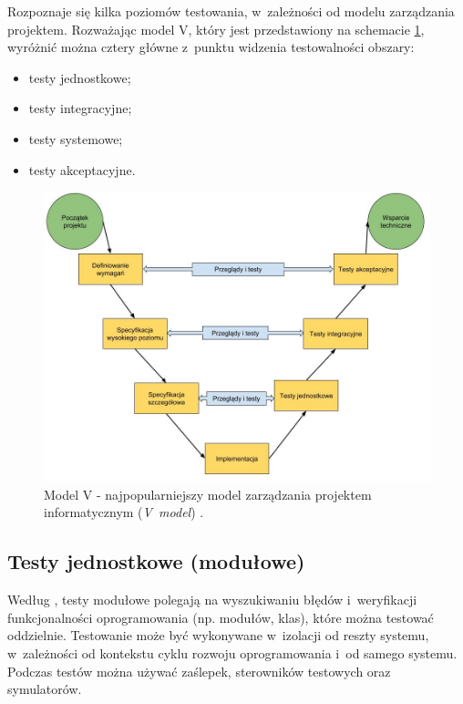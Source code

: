 Rozpoznaje się kilka poziomów testowania, w~zależności od modelu zarządzania projektem. Rozważając model V, który jest przedstawiony na schemacie \ref{fig:model_v}, wyróżnić można cztery główne  z~punktu widzenia testowalności obszary:

\begin{itemize}
\item
testy jednostkowe;
\item
testy integracyjne;
\item
testy systemowe;
\item
testy akceptacyjne.

\end{itemize}

\begin{figure}[!htb]
    \centering
    \includegraphics[width=12cm]{imgs/ch2_model_v_pl.jpg}
    \caption{Model V - najpopularniejszy model zarządzania projektem informatycznym (\textit{V~model}) \cite{website:android:modelv}.}
    \label{fig:model_v}
\end{figure} 

\subsection{Testy jednostkowe (modułowe)}

Według \cite{bib:sylabus:foundation}, testy modułowe polegają na wyszukiwaniu błędów i~weryfikacji funkcjonalności oprogramowania (np. modułów, klas), które można testować oddzielnie. Testowanie może być wykonywane w~izolacji od reszty systemu, w~zależności od kontekstu cyklu rozwoju oprogramowania i~od samego systemu. Podczas testów można używać zaślepek, sterowników testowych oraz symulatorów. 

